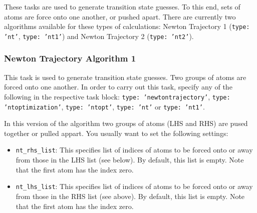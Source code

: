 \documentclass[]{tufte-book}
\begin{document}
These tasks are used to generate transition state guesses.
To this end, sets of atoms are force onto one another, or pushed apart.
There are currently two algorithms available for these types of calculations:
Newton Trajectory 1 (\texttt{type: 'nt'}, \texttt{type: 'nt1'}) and Newton Trajectory 2 (\texttt{type: 'nt2'}).

\subsubsection{Newton Trajectory Algorithm 1}

This task is used to generate transition state guesses. Two groups of atoms are forced onto one another.
In order to carry out this task, specify any of the following in the respective task block:
\texttt{type: 'newtontrajectory'}, \texttt{type: 'ntoptimization'}, \texttt{type: 'ntopt'}, \texttt{type: 'nt'} or \texttt{type: 'nt1'}.

In this version of the algorithm two groups of atoms (LHS and RHS) are pused together or pulled appart.
You usually want to set the following settings:
\begin{itemize}
\item \texttt{nt\_rhs\_list}: This specifies list of indices of atoms to be forced onto or away from those
in the LHS list (see below). By default, this list is empty. Note that the first atom has the index zero.
\item \texttt{nt\_lhs\_list}: This specifies list of indices of atoms to be forced onto or away from those
in the RHS list (see above). By default, this list is empty. Note that the first atom has the index zero.
\end{itemize}
\end{document}
